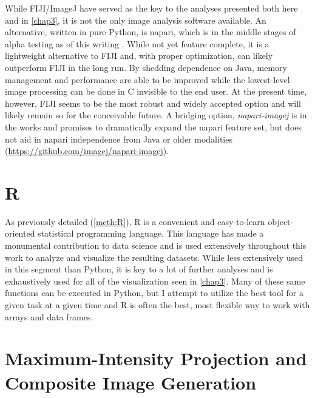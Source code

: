 While FIJI/ImageJ have served as the key to the analyses presented both here and in \autoref{chap3}, it is not the only image analysis software available. An alternative, written in pure Python, is napari, which is in the middle stages of alpha testing as of this writing \citep{napari}. While not yet feature complete, it is a lightweight alternative to FIJI and, with proper optimization, can likely outperform FIJI in the long run. By shedding dependence on Java, memory management and performance are able to be improved while the lowest\hyp{}level image processing can be done in C invisible to the end user. At the present time, however, FIJI seems to be the most robust and widely accepted option and will likely remain so for the conceivable future. A bridging option, \textit{napari\hyp{}imagej} is in the works and promises to dramatically expand the napari feature set, but does not aid in napari independence from Java or older modalities (\url{https://github.com/imagej/napari-imagej}).

\section{R}\label{R}

As previously detailed (\autoref{meth:R}), R is a convenient and easy\hyp{}to\hyp{}learn object\hyp{}oriented statistical programming language. This language has made a monumental contribution to data science and is used extensively throughout this work to analyze and visualize the resulting datasets. While less extensively used in this segment than Python, it is key to a lot of further analyses and is exhaustively used for all of the visualization seen in \autoref{chap3}. Many of these same functions can be executed in Python, but I attempt to utilize the best tool for a given task at a given time and R is often the best, most flexible way to work with arrays and data frames.

\section{Maximum\hyp{}Intensity Projection and Composite Image Generation}\label{mippers}

